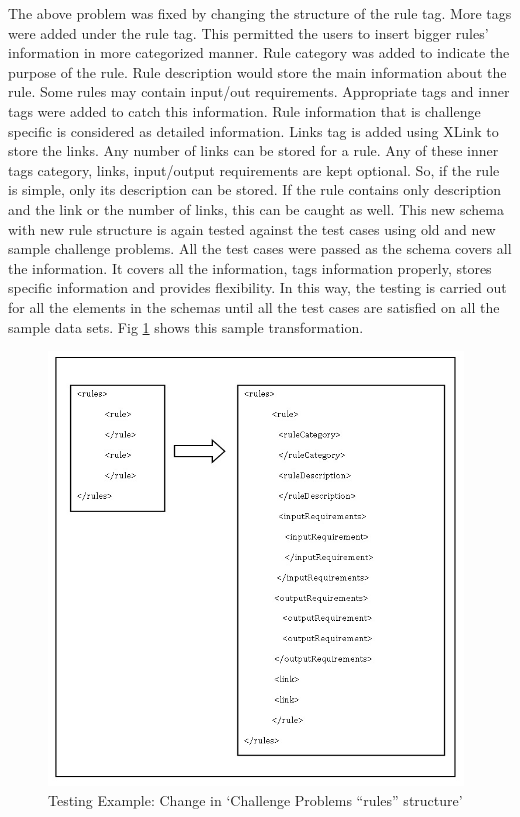 \documentclass[11pt,letterpaper]{report}
\begin{document}
The above problem was fixed by changing the structure of the rule tag. More tags were added under the rule tag. This permitted the users to insert bigger rules' information in more categorized manner. Rule category was added to indicate the purpose of the rule. Rule description would store the main information about the rule. Some rules may contain input/out requirements. Appropriate tags and inner tags were added to catch this information. Rule information that is challenge specific is considered as detailed information. Links tag is added using XLink to store the links. Any number of links can be stored for a rule. Any of these inner tags category, links, input/output requirements are kept optional. So, if the rule is simple, only its description can be stored. If the rule contains only description and the link or the number of links, this can be caught as well. This new schema with new rule structure is again tested against the test cases using old and new sample challenge problems. All the test cases were passed as the schema covers all the information. It covers all the information, tags information properly, stores specific information and provides flexibility. In this way, the testing is carried out for all the elements in the schemas until all the test cases are satisfied on all the sample data sets. Fig \ref{Fig:2} shows this sample transformation.    
\begin{figure}[ht]
\centering
\includegraphics[width=110mm]{Images/rules.jpg}
\caption{Testing Example: Change in `Challenge Problems ``rules'' structure'}
\label{Fig:2}
\end{figure}
\end{document}
